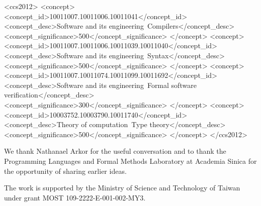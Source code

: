 \documentclass[acmsmall,screen]{acmart}
\theoremstyle{acmdefinition}
\begin{document}
\begin{CCSXML}
<ccs2012>
   <concept>
       <concept_id>10011007.10011006.10011041</concept_id>
       <concept_desc>Software and its engineering~Compilers</concept_desc>
       <concept_significance>500</concept_significance>
       </concept>
   <concept>
       <concept_id>10011007.10011006.10011039.10011040</concept_id>
       <concept_desc>Software and its engineering~Syntax</concept_desc>
       <concept_significance>500</concept_significance>
       </concept>
   <concept>
       <concept_id>10011007.10011074.10011099.10011692</concept_id>
       <concept_desc>Software and its engineering~Formal software verification</concept_desc>
       <concept_significance>300</concept_significance>
       </concept>
   <concept>
       <concept_id>10003752.10003790.10011740</concept_id>
       <concept_desc>Theory of computation~Type theory</concept_desc>
       <concept_significance>500</concept_significance>
       </concept>
 </ccs2012>
\end{CCSXML}



\maketitle









\begin{acks}
We thank Nathanael Arkor for the useful conversation and to thank the Programming Languages and Formal Methods Laboratory at Academia Sinica for the opportunity of sharing earlier ideas.

The work is supported by the Ministry of Science and Technology of Taiwan under grant MOST 109-2222-E-001-002-MY3.
\end{acks}



\end{document}
